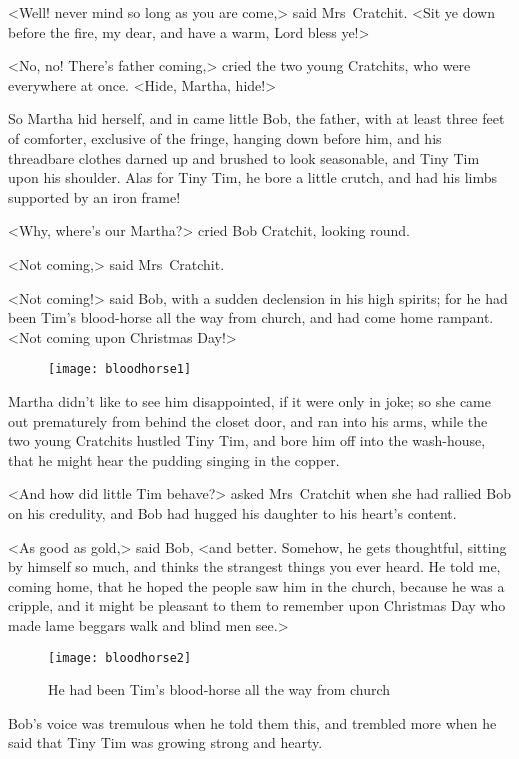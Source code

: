 <Well! never mind so long as you are come,> said Mrs~Cratchit. <Sit ye down before the fire, my dear, and have a warm, Lord bless ye!>

<No, no! There's father coming,> cried the two young Cratchits, who were everywhere at once. <Hide, Martha, hide!>


So Martha hid herself, and in came little Bob, the father, with at least three feet of comforter, exclusive of the fringe, hanging down before him, and his threadbare clothes darned up and brushed to look seasonable, and Tiny Tim upon his shoulder. Alas for Tiny Tim, he bore a little crutch, and had his limbs supported by an iron frame!

<Why, where's our Martha?> cried Bob Cratchit, looking round.

<Not coming,> said Mrs~Cratchit.


<Not coming!> said Bob, with a sudden declension in his high spirits; for he had been Tim's blood-horse all the way from church, and had come home rampant. <Not coming upon Christmas Day!>


\begin{figure}[t!]
\centering
\texttt{[image: bloodhorse1]}
\end{figure}

Martha didn't like to see him disappointed, if it were only in joke; so she came out prematurely from behind the closet door, and ran into his arms, while the two young Cratchits hustled Tiny Tim, and bore him off into the wash-house, that he might hear the pudding singing in the copper.

<And how did little Tim behave?> asked Mrs~Cratchit when she had rallied Bob on his credulity, and Bob had hugged his daughter to his heart's content.


<As good as gold,> said Bob, <and better. Somehow, he gets  thoughtful, sitting by himself so much, and thinks the strangest things you ever heard. He told me, coming home, that he hoped the people saw him in the church, because he was a cripple, and it might be pleasant to them to remember upon Christmas Day who made lame beggars walk and blind men see.>

\begin{figure}[th!]
\centering
\texttt{[image: bloodhorse2]}
\caption{He had been Tim's blood-horse all the way from church}
\end{figure}

Bob's voice was tremulous when he told them this, and trem\-bled more when he said that Tiny Tim was growing strong and hearty.

